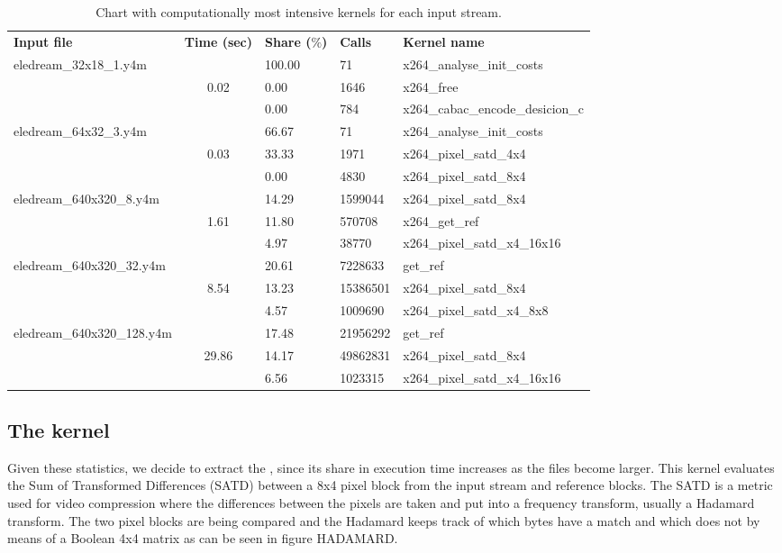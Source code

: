 \begin{table}[htb]%
\centering
\small
	\begin{tabular}{lclll}
		\centering
		\bf{Input file} & \bf{Time (sec)} 	& \bf{Share ($\%$)} & \bf{Calls}	& \bf{Kernel name} \\ \cline{1-5}
		\multirow{3}{*}{eledream\_32x18\_1.y4m}	&				& 100.00	& 71		&	x264\_analyse\_init\_costs\\ 
																						&	0.02	& 0.00 		& 1646	&	x264\_free\\ 
																						&				& 0.00		& 784		&	x264\_cabac\_encode\_desicion\_c\\ \cline{1-5}
		\multirow{3}{*}{eledream\_64x32\_3.y4m} & 			& 66.67		& 71		& x264\_analyse\_init\_costs\\
																						&	0.03	& 33.33 	& 1971	&	x264\_pixel\_satd\_4x4\\ 
																						&				& 0.00		& 4830	&	x264\_pixel\_satd\_8x4\\ \cline{1-5}
		\multirow{3}{*}{eledream\_640x320\_8.y4m}	& 			& 14.29	& 1599044		&	x264\_pixel\_satd\_8x4\\ 
																							&	1.61	& 11.80 	& 570708	&	x264\_get\_ref\\ 
																							&				& 4.97		& 38770		&	x264\_pixel\_satd\_x4\_16x16\\ \cline{1-5}
		\multirow{3}{*}{eledream\_640x320\_32.y4m}& 			& 20.61		& 7228633		&	get\_ref\\ 
																							& 8.54	& 13.23 	& 15386501	&	x264\_pixel\_satd\_8x4\\ 
																							&				& 4.57		& 1009690		&	x264\_pixel\_satd\_x4\_8x8\\ \cline{1-5}
		\multirow{3}{*}{eledream\_640x320\_128.y4m}&			& 17.48		& 21956292	&	get\_ref\\
																							&	 29.86& 14.17 	& 49862831	&	x264\_pixel\_satd\_8x4\\
																							&				& 6.56		& 1023315		&	x264\_pixel\_satd\_x4\_16x16\\ \cline{1-5}
	\end{tabular}	
\caption{Chart with computationally most intensive kernels for each input stream.}
\label{tab:chart}
\end{table}

\subsection{The  kernel}
\label{sec:kernel}
Given these statistics, we decide to extract the , since its share in execution time increases as the files become larger. This kernel evaluates the Sum of Transformed Differences (SATD) between a 8x4 pixel block from the input stream and reference blocks. The SATD is a metric used for video compression where the differences between the pixels are taken and put into a frequency transform, usually a Hadamard transform. The two pixel blocks are being compared and the Hadamard keeps track of which bytes have a match and which does not by means of a Boolean 4x4 matrix as can be seen in figure HADAMARD.

